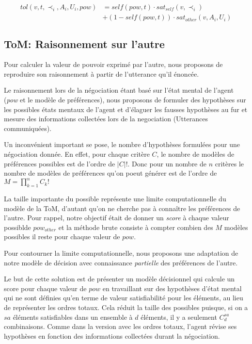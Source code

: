 \documentclass{llncs}
\begin{document}
	\begin{equation}
	\begin{split}
	tol(v, t, \prec_i, A_i, U_i, pow) & = self(pow, t)  \cdot sat_{self}(v, \prec_i) \\
	& +  (1 - self(pow, t)) \cdot sat_{other}(v, A_i, U_i)
	\end{split} 
	\end{equation}
	
	
	\subsection{ToM: Raisonnement sur l'autre}
	
	
	Pour calculer la valeur de pouvoir exprimé par l'autre, nous proposons de reproduire son raisonnement à partir de l'utterance qu'il énoncée.
	
	Le raisonnement lors de la négociation étant basé  sur l'état mental de l'agent (\textit{pow} et le modèle de préférences), nous proposons de formuler des hypothèses sur les possibles états mentaux de l'agent et d'élaguer les fausses hypothèses au fur et mesure des informations collectées lors de la negociation (Utterances communiquées).
	
	Un inconvénient important se pose, le nombre d'hypothèses formulées pour une négociation donnée. En effet, pour chaque critère $C$, le nombre de modèles de préférences possibles est de l'ordre de $|C| !$. Donc pour un nombre de $n$ critères le nombre de modèles de préférences qu'on poeut générer est de l'ordre de $ M = \prod_{k=1}^n C_k!$
	
	La taille importante du possible représente une limite computationnelle du modèle de la ToM, d'autant qu'on ne cherche pas à connaître les préférences de l'autre. Pour rappel, notre objectif était de donner un \emph{score} à chaque valeur possiblde $pow_{other}$ et la méthode brute consiste à compter combien des $M$ modèles possibles il reste pour chaque valeur de $pow$.
	
	Pour contourner la limite computationnelle, nous proposons une adaptation de notre modèle de décision avec connaissance \emph{partielle} des préférences de l'autre. 
	
	Le but de cette solution est de présenter un modèle décisionnel qui calcule un score pour chaque valeur de $pow$ en travaillant sur des hypothèses d'état mental qui ne sont définies qu'en terme de valeur satisfiabilité pour les éléments, au lieu de représenter les ordres totaux. Cela réduit la taille des possibles puisque, si on a $sa$ éléments satisfiables dans un ensemble à $d$ éléments, il y a seulement $C_d^{sa}$ combinaisons.
	Comme dans la version avec les ordres totaux, l'agent révise ses hypothèses en fonction des informations collectées durant la négociation.
	
\end{document}
